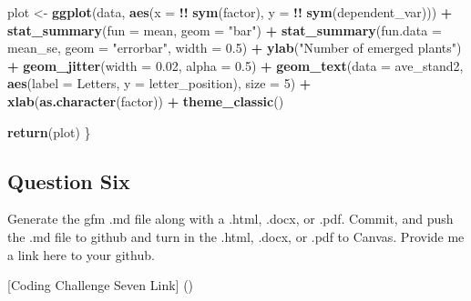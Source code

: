 \documentclass[
  12pt,
]{article}
\newenvironment{Shaded}{\begin{snugshade}}{\end{snugshade}}
\newcommand{\AttributeTok}[1]{\textcolor[rgb]{0.13,0.29,0.53}{#1}}
\newcommand{\DecValTok}[1]{\textcolor[rgb]{0.00,0.00,0.81}{#1}}
\newcommand{\FloatTok}[1]{\textcolor[rgb]{0.00,0.00,0.81}{#1}}
\newcommand{\FunctionTok}[1]{\textcolor[rgb]{0.13,0.29,0.53}{\textbf{#1}}}
\newcommand{\NormalTok}[1]{#1}
\newcommand{\OtherTok}[1]{\textcolor[rgb]{0.56,0.35,0.01}{#1}}
\newcommand{\SpecialCharTok}[1]{\textcolor[rgb]{0.81,0.36,0.00}{\textbf{#1}}}
\newcommand{\StringTok}[1]{\textcolor[rgb]{0.31,0.60,0.02}{#1}}
\begin{document}
\begin{Shaded}
\begin{Highlighting}[]
\NormalTok{  plot }\OtherTok{\textless{}{-}} \FunctionTok{ggplot}\NormalTok{(data, }\FunctionTok{aes}\NormalTok{(}\AttributeTok{x =} \SpecialCharTok{!!} \FunctionTok{sym}\NormalTok{(factor), }\AttributeTok{y =} \SpecialCharTok{!!} \FunctionTok{sym}\NormalTok{(dependent\_var))) }\SpecialCharTok{+} 
    \FunctionTok{stat\_summary}\NormalTok{(}\AttributeTok{fun =}\NormalTok{ mean, }\AttributeTok{geom =} \StringTok{"bar"}\NormalTok{) }\SpecialCharTok{+}
    \FunctionTok{stat\_summary}\NormalTok{(}\AttributeTok{fun.data =}\NormalTok{ mean\_se, }\AttributeTok{geom =} \StringTok{"errorbar"}\NormalTok{, }\AttributeTok{width =} \FloatTok{0.5}\NormalTok{) }\SpecialCharTok{+}
    \FunctionTok{ylab}\NormalTok{(}\StringTok{"Number of emerged plants"}\NormalTok{) }\SpecialCharTok{+} 
    \FunctionTok{geom\_jitter}\NormalTok{(}\AttributeTok{width =} \FloatTok{0.02}\NormalTok{, }\AttributeTok{alpha =} \FloatTok{0.5}\NormalTok{) }\SpecialCharTok{+}
    \FunctionTok{geom\_text}\NormalTok{(}\AttributeTok{data =}\NormalTok{ ave\_stand2, }\FunctionTok{aes}\NormalTok{(}\AttributeTok{label =}\NormalTok{ Letters, }\AttributeTok{y =}\NormalTok{ letter\_position), }
              \AttributeTok{size =} \DecValTok{5}\NormalTok{) }\SpecialCharTok{+}
    \FunctionTok{xlab}\NormalTok{(}\FunctionTok{as.character}\NormalTok{(factor)) }\SpecialCharTok{+}
    \FunctionTok{theme\_classic}\NormalTok{()}
  
  \FunctionTok{return}\NormalTok{(plot)}
\NormalTok{\}}
\end{Highlighting}
\end{Shaded}

\subsection{Question Six}\label{question-six}

Generate the gfm .md file along with a .html, .docx, or .pdf. Commit,
and push the .md file to github and turn in the .html, .docx, or .pdf to
Canvas. Provide me a link here to your github.

{[}Coding Challenge Seven Link{]} ()
\end{document}
